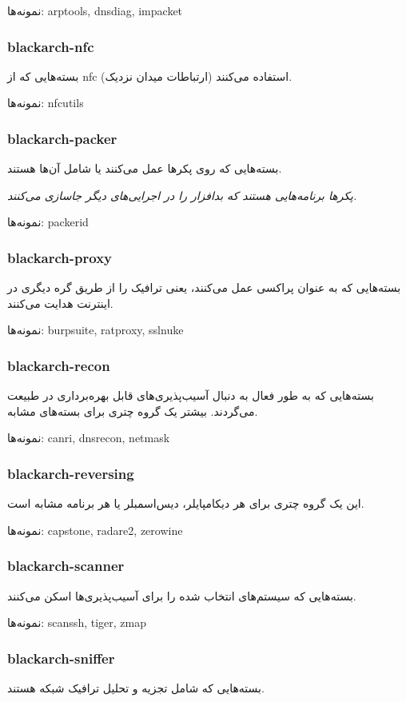 \documentclass[a4paper, oneside, 11pt]{book}
\begin{document}
نمونه‌ها: arptools, dnsdiag, impacket

\subsubsection{blackarch-nfc}
بسته‌هایی که از nfc (ارتباطات میدان نزدیک) استفاده می‌کنند.

نمونه‌ها: nfcutils

\subsubsection{blackarch-packer}
بسته‌هایی که روی پکرها عمل می‌کنند یا شامل آن‌ها هستند.

\textit{پکرها برنامه‌هایی هستند که بدافزار را در اجرایی‌های دیگر جاسازی می‌کنند.}

نمونه‌ها: packerid

\subsubsection{blackarch-proxy}
بسته‌هایی که به عنوان پراکسی عمل می‌کنند، یعنی ترافیک را
از طریق گره دیگری در اینترنت هدایت می‌کنند.

نمونه‌ها: burpsuite, ratproxy, sslnuke

\subsubsection{blackarch-recon}
بسته‌هایی که به طور فعال به دنبال آسیب‌پذیری‌های قابل بهره‌برداری در
طبیعت می‌گردند. بیشتر یک گروه چتری برای بسته‌های مشابه.

نمونه‌ها: canri, dnsrecon, netmask

\subsubsection{blackarch-reversing}
این یک گروه چتری برای هر دیکامپایلر،
دیس‌اسمبلر یا هر برنامه مشابه است.

نمونه‌ها: capstone, radare2, zerowine

\subsubsection{blackarch-scanner}
بسته‌هایی که سیستم‌های انتخاب شده را برای آسیب‌پذیری‌ها اسکن می‌کنند.

نمونه‌ها: scanssh, tiger, zmap

\subsubsection{blackarch-sniffer}
بسته‌هایی که شامل تجزیه و تحلیل ترافیک شبکه هستند.
\end{document}
